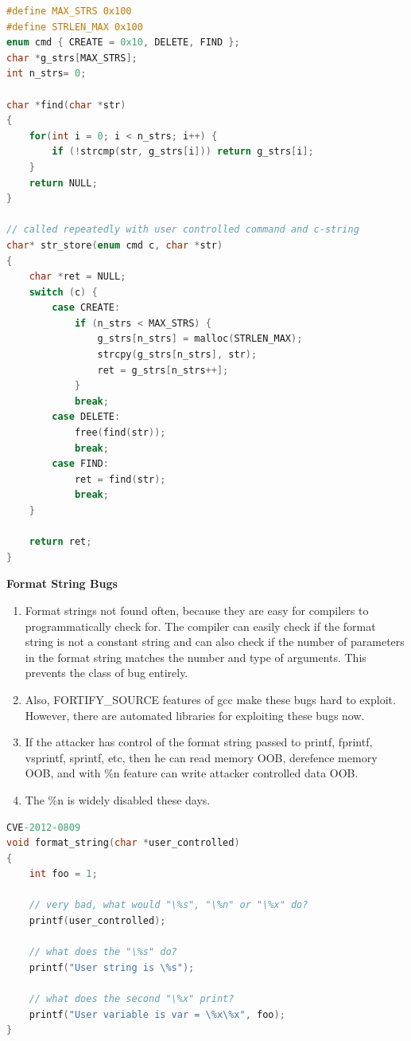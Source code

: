 \documentclass[12pt]{Training}
\begin{document}
\begin{sectionbox}
\begin{lstlisting}[language=C, caption={Heap Corruption}]
#define MAX_STRS 0x100
#define STRLEN_MAX 0x100
enum cmd { CREATE = 0x10, DELETE, FIND };
char *g_strs[MAX_STRS];
int n_strs= 0;

char *find(char *str)
{
    for(int i = 0; i < n_strs; i++) {
        if (!strcmp(str, g_strs[i])) return g_strs[i];
    }   
    return NULL;
}

// called repeatedly with user controlled command and c-string
char* str_store(enum cmd c, char *str)
{
    char *ret = NULL;
    switch (c) {
        case CREATE:
            if (n_strs < MAX_STRS) {
                g_strs[n_strs] = malloc(STRLEN_MAX);
                strcpy(g_strs[n_strs], str);
                ret = g_strs[n_strs++];
            }
            break;
        case DELETE:
            free(find(str));
            break;
        case FIND:
            ret = find(str);
            break;
    }   

    return ret;
}
\end{lstlisting}
\end{sectionbox}

\textbf{Format String Bugs}
\begin{enumerate}
    \item Format strings not found often, because they are easy for compilers to programmatically check for. The compiler can easily check if the format string is not a constant string and can also check if the number of parameters in the format string matches the number and type of arguments. This prevents the class of bug entirely.
    \item Also, FORTIFY\_SOURCE features of gcc make these bugs hard to exploit. However, there are automated libraries for exploiting these bugs now. 
    \item If the attacker has control of the format string passed to printf, fprintf, vsprintf, sprintf, etc, then he can read memory OOB, derefence memory OOB, and with \%n feature can write attacker controlled data OOB.
    \item The \%n is widely disabled these days.
\end{enumerate}
\begin{sectionbox}
\begin{lstlisting}[language=C, caption={Format Strings}]
CVE-2012-0809
void format_string(char *user_controlled)
{
    int foo = 1;

    // very bad, what would "\%s", "\%n" or "\%x" do?
    printf(user_controlled); 

    // what does the "\%s" do?
    printf("User string is \%s");

    // what does the second "\%x" print?
    printf("User variable is var = \%x\%x", foo);
}
\end{lstlisting}
\end{sectionbox}
\end{document}
